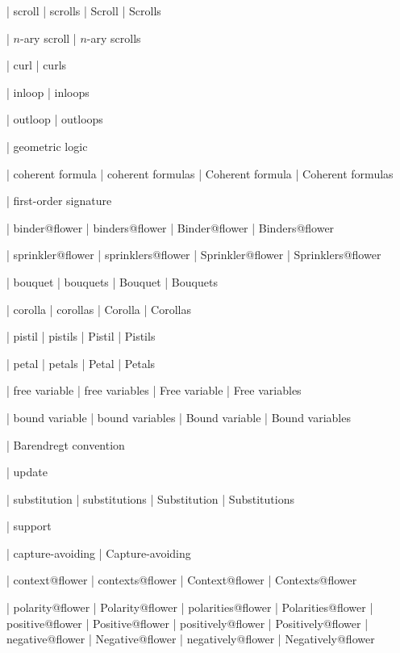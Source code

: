 
 | scroll
 | scrolls
 | Scroll
 | Scrolls

 | $n$-ary scroll
 | $n$-ary scrolls

 | curl
 | curls

 | inloop
 | inloops

 | outloop
 | outloops

 | geometric logic

 | coherent formula
 | coherent formulas
 | Coherent formula
 | Coherent formulas

 | first-order signature

 | binder@flower
 | binders@flower
 | Binder@flower
 | Binders@flower

 | sprinkler@flower
 | sprinklers@flower
 | Sprinkler@flower
 | Sprinklers@flower

 | bouquet
 | bouquets
 | Bouquet
 | Bouquets

 | corolla
 | corollas
 | Corolla
 | Corollas

 | pistil
 | pistils
 | Pistil
 | Pistils

 | petal
 | petals
 | Petal
 | Petals

 | free variable
 | free variables
 | Free variable
 | Free variables

 | bound variable
 | bound variables
 | Bound variable
 | Bound variables

 | Barendregt convention

 | update

 | substitution
 | substitutions
 | Substitution
 | Substitutions

 | support

 | capture-avoiding
 | Capture-avoiding

 | context@flower
 | contexts@flower
 | Context@flower
 | Contexts@flower

 | polarity@flower
 | Polarity@flower
 | polarities@flower
 | Polarities@flower
 | positive@flower
 | Positive@flower
 | positively@flower
 | Positively@flower
 | negative@flower
 | Negative@flower
 | negatively@flower
 | Negatively@flower

